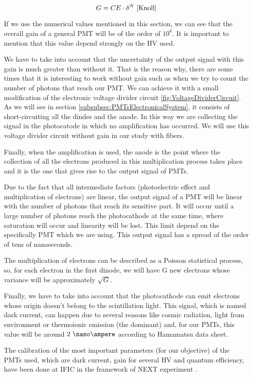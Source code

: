 \begin{itemize}
\begin{equation}
G = CE\cdot{} \delta^N~\cite{Knoll}
\label{eq:PMTGain}
\end{equation}

If we use the numerical values mentioned in this section, we can see that the overall gain of a general PMT will be of the order of $10^6$. It is important to mention that this value depend strongly on the HV used.

We have to take into account that the uncertainty of the output signal with this gain is much greater than without it. That is the reason why, there are some times that it is interesting to work without gain such as when we try to count the number of photons that reach our PMT. We can achieve it with a small modification of the electronic voltage divider circuit \ref{fig:VoltageDividerCircuit}. As we will see in section \ref{subsubsec:PMTsElectronicalSystem}, it consists of short-circuiting all the dindes and the anode. In this way we are collecting the signal in the photocatode in which no amplification has occurred. We will use this voltage divider circuit without gain in our study with fibers.

Finally, when the amplification is used, the anode is the point where the collection of all the electrons produced in this multiplication process takes place and it is the one that gives rise to the output signal of PMTs. 

\end{itemize}

Due to the fact that all intermediate factors (photoelectric effect and multiplication of electrons) are linear, the output signal of a PMT will be linear with the number of photons that reach its sensitive part. It will occur until a large number of photons reach the photocathode at the same time, where saturation will occur and linearity will be lost. This limit depend on the specifically PMT which we are using. This output signal has a spread of the order of tens of nanoseconds.

The multiplication of electrons can be described as a Poisson statistical process, so, for each electron in the first dinode, we will have G new electrons whose variance will be approximately $\sqrt{G}$.

Finally, we have to take into account that the photocathode can emit electrons whose origin doesn't belong to the scintillation light. This signal, which is named dark current, can  happen due to several reasons like cosmic radiation, light from environment or thermoionic emission (the dominant) and, for our PMTs, this value will be around $2~\nano\ampere$ according to Hamamatsu data sheet.

The calibration of the most important parameters (for our objective) of the PMTs used, which are dark current, gain for several HV and quantum efficiency,  have been done at IFIC in the framework of NEXT experiment \cite{CalibrationPMTsNEXT}. 